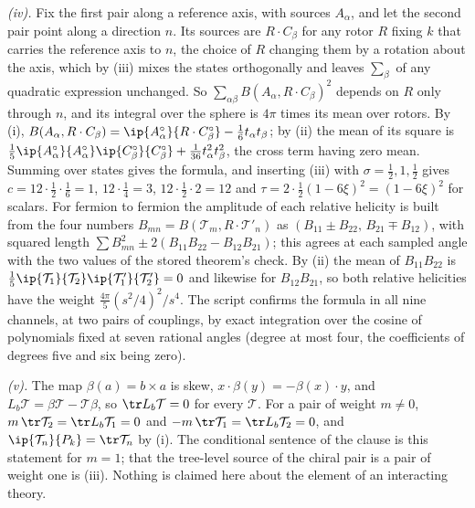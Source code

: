 \emph{(iv).} Fix the first pair along a reference axis, with sources $A_{\alpha}$, and let the second pair point along a direction $n$. Its sources are $R \cdot C_{\beta}$ for any rotor $R$ fixing $k$ that carries the reference axis to $n$, the choice of $R$ changing them by a rotation about the axis, which by (iii) mixes the states orthogonally and leaves $\sum_{\beta}$ of any quadratic expression unchanged. So $\sum_{\alpha\beta} B(A_{\alpha}, R \cdot C_{\beta})^{2}$ depends on $R$ only through $n$, and its integral over the sphere is $4\pi$ times its mean over rotors. By (i), $B(A_{\alpha}, R \cdot C_{\beta}) = \ip{A_{\alpha}^{\circ}}{R \cdot C_{\beta}^{\circ}} - \tfrac16 t_{\alpha}t_{\beta}$; by (ii) the mean of its square is $\tfrac15\ip{A_{\alpha}^{\circ}}{A_{\alpha}^{\circ}}\ip{C_{\beta}^{\circ}}{C_{\beta}^{\circ}} + \tfrac{1}{36}t_{\alpha}^{2}t_{\beta}^{2}$, the cross term having zero mean. Summing over states gives the formula, and inserting (iii) with $\sigma = \tfrac12, 1, \tfrac12$ gives $c = 12 \cdot \tfrac12 \cdot \tfrac16 = 1$, $12 \cdot \tfrac14 = 3$, $12 \cdot \tfrac12 \cdot 2 = 12$ and $\tau = 2 \cdot \tfrac12 (1 - 6\xi)^{2} = (1 - 6\xi)^{2}$ for scalars. For fermion to fermion the amplitude of each relative helicity is built from the four numbers $B_{mn} = B(\mathcal{T}_{m}, R \cdot \mathcal{T}'_{n})$ as $(B_{11} \pm B_{22},\, B_{21} \mp B_{12})$, with squared length $\sum B_{mn}^{2} \pm 2(B_{11}B_{22} - B_{12}B_{21})$; this agrees at each sampled angle with the two values of the stored theorem's check. By (ii) the mean of $B_{11}B_{22}$ is $\tfrac15\ip{\mathcal{T}_{1}}{\mathcal{T}_{2}}\ip{\mathcal{T}'_{1}}{\mathcal{T}'_{2}} = 0$ and likewise for $B_{12}B_{21}$, so both relative helicities have the weight $\tfrac{4\pi}{5}(s^{2}/4)^{2}/s^{4}$. The script confirms the formula in all nine channels, at two pairs of couplings, by exact integration over the cosine of polynomials fixed at seven rational angles (degree at most four, the coefficients of degrees five and six being zero).

\emph{(v).} The map $\beta(a) = b \times a$ is skew, $x \cdot \beta(y) = -\beta(x) \cdot y$, and $L_{b}\mathcal{T} = \beta\mathcal{T} - \mathcal{T}\beta$, so $\tr L_{b}\mathcal{T} = 0$ for every $\mathcal{T}$. For a pair of weight $m \neq 0$, $m\,\tr\mathcal{T}_{2} = \tr L_{b}\mathcal{T}_{1} = 0$ and $-m\,\tr\mathcal{T}_{1} = \tr L_{b}\mathcal{T}_{2} = 0$, and $\ip{\mathcal{T}_{n}}{P_{k}} = \tr\mathcal{T}_{n}$ by (i). The conditional sentence of the clause is this statement for $m = 1$; that the tree-level source of the chiral pair is a pair of weight one is (iii). Nothing is claimed here about the element of an interacting theory.

